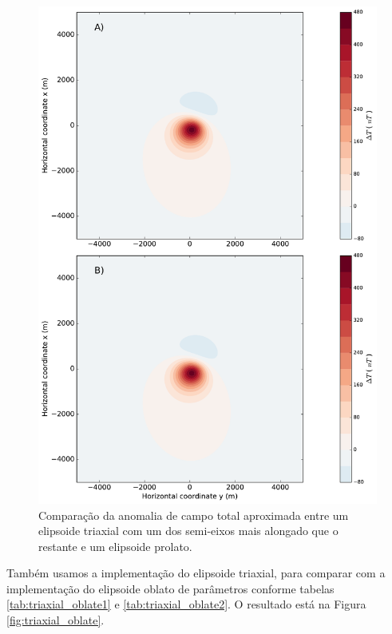 \begin{figure}[hbt!]
	\centering \includegraphics[width=14.5 cm,height=22 cm]{figures/ellipsoid_triaxial_prolate}
	\caption[Comparação da anomalia de campo total aproximada entre um elipsoide triaxial com um dos semi-eixos mais alongado que o 
	restante e um elipsoide prolato.]{Comparação da anomalia de campo total aproximada entre um elipsoide triaxial com um dos semi-eixos mais alongado que o restante e um elipsoide prolato.}
	\label{fig:triaxial_prolate}
\end{figure}

Também usamos a implementação do elipsoide triaxial, para comparar com a implementação do elipsoide oblato de parâmetros conforme tabelas \ref{tab:triaxial_oblate1} e \ref{tab:triaxial_oblate2}. O resultado está na Figura \ref{fig:triaxial_oblate}.

